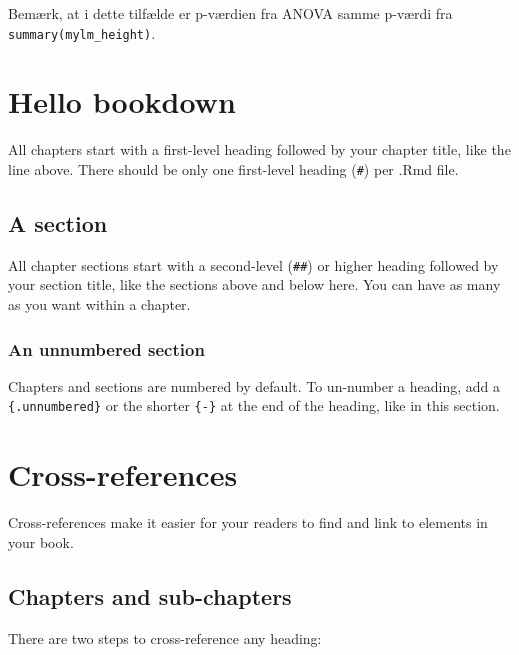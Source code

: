 \documentclass[
]{book}
\theoremstyle{definition}
\theoremstyle{definition}
\theoremstyle{definition}
\theoremstyle{definition}
\theoremstyle{remark}
\begin{document}
Bemærk, at i dette tilfælde er p-værdien fra ANOVA samme p-værdi fra \texttt{summary(mylm\_height)}.

\chapter{Hello bookdown}\label{hello-bookdown}

All chapters start with a first-level heading followed by your chapter title, like the line above. There should be only one first-level heading (\texttt{\#}) per .Rmd file.

\section{A section}\label{a-section}

All chapter sections start with a second-level (\texttt{\#\#}) or higher heading followed by your section title, like the sections above and below here. You can have as many as you want within a chapter.

\subsection*{An unnumbered section}\label{an-unnumbered-section}

Chapters and sections are numbered by default. To un-number a heading, add a \texttt{\{.unnumbered\}} or the shorter \texttt{\{-\}} at the end of the heading, like in this section.

\chapter{Cross-references}\label{cross}

Cross-references make it easier for your readers to find and link to elements in your book.

\section{Chapters and sub-chapters}\label{chapters-and-sub-chapters}

There are two steps to cross-reference any heading:
\end{document}
